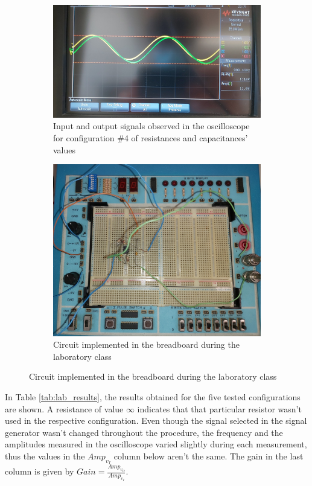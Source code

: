 \begin{figure}[H]
  \begin{subfigure}{.49\linewidth}
    \centering
    \includegraphics[width=0.95\linewidth]{../Oscilloscope4.jpeg}
    \footnotesize
  \caption{Input and output signals observed in the oscilloscope for configuration $\#$4 of resistances and capacitances' values}
   \label{fig:oscilloscope}
  \end{subfigure}
  \hspace{5mm}
  \begin{subfigure}{.49\linewidth}
    \centering
  \includegraphics[width=0.95\linewidth]{../Breadboard.jpg}
  \caption{Circuit implemented in the breadboard during the laboratory class}
  \label{fig:breadboard}
  \end{subfigure}
\end{figure}

In Table \ref{tab:lab_results}, the results obtained for the five tested configurations are shown. A resistance of value $\infty$ indicates that that particular resistor wasn't used in the respective configuration. Even though the signal selected in the signal generator wasn't changed throughout the procedure, the frequency and the amplitudes measured in the oscilloscope varied slightly during each measurement, thus the values in the $Amp_{v_I}$ column below aren't the same. The gain in the last column is given by $Gain=\frac{Amp_{v_O}}{Amp_{v_I}}$.

